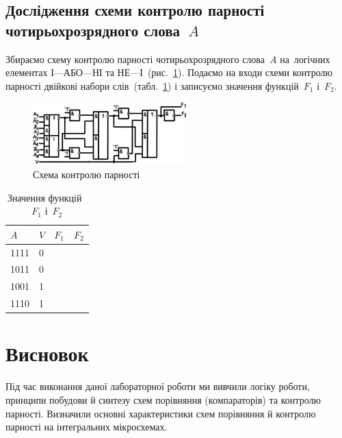 \documentclass[a4paper,oneside,DIV=12,12pt,headings=normal]{scrartcl}
\begin{document}
		\subsection{Дослідження схеми контролю парності чотирьохрозрядного слова~$A$}
			Збираємо схему контролю парності чотирьохрозрядного слова~$A$ на~логічних елементах І—АБО—НІ та НЕ—І~(рис.~\ref{fig:comparator-schematic-04}). Подаємо на входи схеми контролю парності двійкові набори слів~(табл.~\ref{tab:comparator-datasets-04}) і записуємо значення функцій~$F_1$ і~$F_2$.
			
			\begin{figure}[!htbp]
			\centering
				\includegraphics[height = 6\baselineskip]{./assets/04.png}
			\caption{Схема контролю парності}
			\label{fig:comparator-schematic-04}
			\end{figure}
			
			\begin{table}[!htbp]
			\centering
				\begin{tabular}{llrr}
					\toprule
						$A$ & $V$ & $F_1$ & $F_2$\\
					\midrule
						1111 & 0 & & \\
						1011 & 0 & & \\
						1001 & 1 & & \\
						1110 & 1 & & \\
					\bottomrule
				\end{tabular}
			\caption{Значення функцій~$F_1$ і~$F_2$}
			\label{tab:comparator-datasets-04}
			\end{table}
			
	\section{Висновок}
		Під час виконання даної лабораторної роботи ми вивчили логіку роботи, принципи побудови й синтезу схем порівняння (компараторів) та контролю парності. Визначили основні характеристики схем порівняння й контролю парності на інтегральних мікросхемах.
\end{document}
